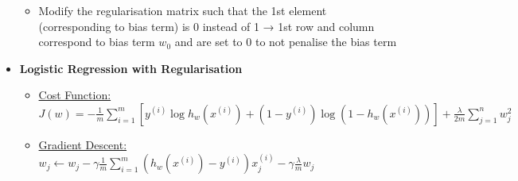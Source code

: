 \documentclass[landscape]{article}
\begin{document}
\begin{multicols*}{5}
\begin{itemize}
\begin{itemize}
            \item Modify the regularisation matrix such that the 1st element (corresponding to bias term) is 0 instead of 1 → 1st row and column correspond to bias term $w_0$ and are set to 0 to not penalise the bias term
          \end{itemize}
          \item \textbf{Logistic Regression with Regularisation}
          \begin{itemize}
            \item \underline{Cost Function:} $J(w) = -\frac{1}{m} \sum_{i=1}^{m} [ y^{(i)} \log h_w(x^{(i)}) +\left( 1 - y^{(i)} \right) \log \left( 1 - h_w(x^{(i)}) \right)] + \frac{\lambda}{2m} \sum_{j=1}^{n} w_j^2$
            \item \underline{Gradient Descent:} $w_j \leftarrow w_j - \gamma \frac{1}{m} \sum_{i=1}^{m} \left( h_w(x^{(i)}) - y^{(i)} \right) x_j^{(i)} - \gamma \frac{\lambda}{m} w_j$
          \end{itemize}
        \end{itemize}


\end{multicols*}
\end{document}
